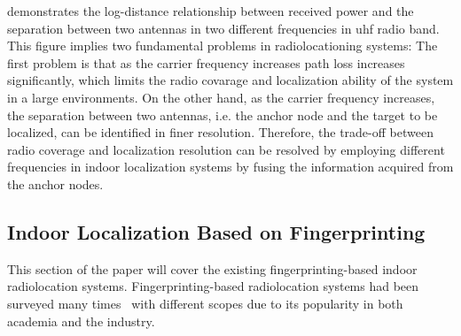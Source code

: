      demonstrates the log-distance relationship between received power and the separation between two antennas in two different frequencies in \gls{uhf} radio band.
    This figure implies two fundamental problems in radiolocationing systems:
    The first problem is that as the carrier frequency increases path loss increases significantly, which limits the radio covarage and localization ability of the system in a large environments.
    On the other hand, as the carrier frequency increases, the separation between two antennas, i.e. the anchor node and the target to be localized, can be identified in finer resolution.
    Therefore, the trade-off between radio coverage and localization resolution can be resolved by employing different frequencies in indoor localization systems by fusing the information acquired from the anchor nodes.

    \subsection{Indoor Localization Based on Fingerprinting}
    This section of the paper will cover the existing fingerprinting-based indoor radiolocation systems.
    Fingerprinting-based radiolocation systems had been surveyed many times~\cite{he2016wi, honkavirta2009comparative} with different scopes due to its popularity in both academia and the industry.

